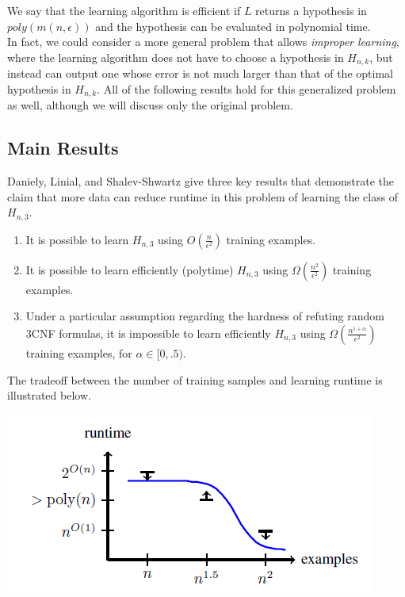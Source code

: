 \documentclass[11pt,a4paper]{article}
\begin{document}
We say that the learning algorithm is efficient if $L$ returns a hypothesis in $poly(m(n, \epsilon) )$ and the hypothesis can be evaluated in polynomial time.\\

In fact, we could consider a more general problem that allows \textit{improper learning}, where the learning algorithm does not have to choose a hypothesis in $H_{n, k}$, but instead can output one whose error is not much larger than that of the optimal hypothesis in $H_{n, k}$. All of the following results hold for this generalized problem as well, although we will discuss only the original problem.

\subsection{Main Results}

Daniely, Linial, and Shalev-Shwartz give three key results that demonstrate the claim that more data can reduce runtime in this problem of learning the class of $H_{n, 3}$.

\begin{enumerate}

\item It is possible to learn $H_{n, 3}$ using $O(\frac{n}{\epsilon^2})$ training examples.
\item It is possible to learn efficiently (polytime) $H_{n, 3}$ using $\Omega(\frac{n^2}{\epsilon^2})$ training examples.
\item Under a particular assumption regarding the hardness of refuting random 3CNF formulas, it is impossible to learn efficiently $H_{n, 3}$ using $\Omega(\frac{n^{1 + \alpha}}{\epsilon^2})$ training examples, for $\alpha \in [0, .5)$.

\end{enumerate}

The tradeoff between the number of training samples and learning runtime is illustrated below.

\includegraphics[scale=1]{tradeoff_graph}
\end{document}
